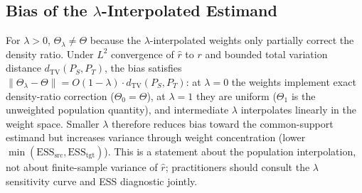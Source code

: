 \subsection{Bias of the $\lambda$-Interpolated Estimand}

For $\lambda > 0$, $\Theta_\lambda \neq \Theta$ because the $\lambda$-interpolated weights only partially correct the density ratio. Under $L^2$ convergence of $\hat{r}$ to $r$ and bounded total variation distance $d_{\mathrm{TV}}(P_S,P_T)$, the bias satisfies $\|\Theta_\lambda - \Theta\| = O(1-\lambda) \cdot d_{\mathrm{TV}}(P_S,P_T)$: at $\lambda=0$ the weights implement exact density-ratio correction ($\Theta_0=\Theta$), at $\lambda=1$ they are uniform ($\Theta_1$ is the unweighted population quantity), and intermediate $\lambda$ interpolates linearly in the weight space. Smaller $\lambda$ therefore reduces bias toward the common-support estimand but increases variance through weight concentration (lower $\min(\mathrm{ESS}_{\mathrm{src}},\mathrm{ESS}_{\mathrm{tgt}})$). This is a statement about the population interpolation, not about finite-sample variance of $\hat{r}$; practitioners should consult the $\lambda$ sensitivity curve and ESS diagnostic jointly.
